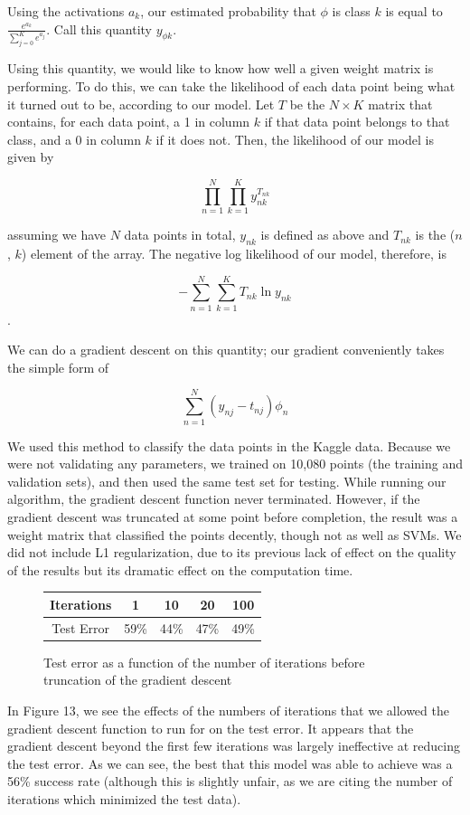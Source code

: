 \documentclass{sigchi}
\begin{document}
Using the activations $a_k$, our estimated probability that $\phi$ is class $k$ is equal to $\frac{e^{a_k}}{\sum_{j=0}^K e^{a_j}}$. Call this quantity $y_{\phi k}$.

Using this quantity, we would like to know how well a given weight matrix is performing. To do this, we can take the likelihood of each data point being what it turned out to be, according to our model. Let $T$ be the $N \times K$ matrix that contains, for each data point, a 1 in column $k$ if that data point belongs to that class, and a 0 in column $k$ if it does not. Then, the likelihood of our model is given by 

$$\prod_{n=1}^N \prod_{k=1}^K y_{nk}^{T_{nk}}$$

assuming we have $N$ data points in total, $y_{nk}$ is defined as above and $T_{nk}$ is the ($n$, $k$) element of the array. The negative log likelihood of our model, therefore, is 

$$-\sum_{n=1}^N \sum_{k=1}^K T_{nk} \ln y_{nk}$$.

We can do a gradient descent on this quantity; our gradient conveniently takes the simple form of 

$$\sum_{n=1}^N (y_{nj}-t_{nj})\phi_n$$

We used this method to classify the data points in the Kaggle data. Because we were not validating any parameters, we trained on 10,080 points (the training and validation sets), and then used the same test set for testing. While running our algorithm, the gradient descent function never terminated. However, if the gradient descent was truncated at some point before completion, the result was a weight matrix that classified the points decently, though not as well as SVMs. We did not include L1 regularization, due to its previous lack of effect on the quality of the results but its dramatic effect on the computation time.

\renewcommand*{\arraystretch}{1.5}
\begin{figure}
\centering
	\begin{tabular}{| c | c | c | c | c |}
	\hline
	Iterations & 1 & 10 & 20 & 100 \\
	\hline
	Test Error & 59\% & 44\% & 47\% & 49\% \\
	\hline
	\end{tabular}
	\caption{Test error as a function of the number of iterations before truncation of the gradient descent}
\end{figure}

In Figure 13, we see the effects of the numbers of iterations that we allowed the gradient descent function to run for on the test error. It appears that the gradient descent beyond the first few iterations was largely ineffective at reducing the test error. As we can see, the best that this model was able to achieve was a 56\% success rate (although this is slightly unfair, as we are citing the number of iterations which minimized the test data).
\end{document}
